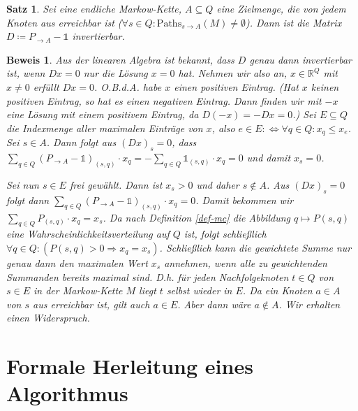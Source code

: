 \documentclass[a4paper]{article}
\newcommand{\mc}{Markow-Kette}
\newtheorem{satz}{Satz}[section] %
\theoremstyle{nonumberplain}
\newtheorem{beweis}{Beweis}
\begin{document}
\begin{satz}\label{th-unique}
	Sei \mcex{} eine endliche \mc, $A\subseteq Q$ eine Zielmenge, die von jedem Knoten aus erreichbar ist ($\forall s\in Q: \mathrm{Paths}_{s\rightarrow A}(M)\neq\emptyset$). 
	Dann ist die Matrix $D \coloneqq P_{\rightarrow A} - \mathbb{1}$ invertierbar.
\end{satz}
\begin{beweis}
	Aus der linearen Algebra ist bekannt, dass $D$ genau dann invertierbar ist, wenn $Dx = 0$ nur die Lösung $x=0$ hat.
	Nehmen wir also an, $x \in \mathbb{R}^Q$ mit $x\neq 0$ erfüllt $Dx = 0$. O.B.d.A. habe $x$ einen positiven Eintrag. (Hat $x$ keinen positiven Eintrag, so hat es einen negativen Eintrag. Dann finden wir mit $-x$ eine Lösung mit einem positivem Eintrag, da $D(-x) = - Dx = 0$.)
	Sei $E \subseteq Q$ die Indexmenge aller maximalen Einträge von $x$, also $e \in E :\Leftrightarrow \forall q \in Q : x_q \leq x_e$.
	Sei $s\in A$. Dann folgt aus $(Dx)_s = 0$, dass $\sum_{q\in Q}{(P_{\rightarrow A}- \mathbb{1})_{(s,q)} \cdot x_q} = -\sum_{q\in Q}{\mathbb{1}_{(s,q)} \cdot x_q} = 0$  und damit $x_s = 0$.
	
	Sei nun $s \in E$ frei gewählt. Dann ist $x_s > 0$ und daher $s\notin A$. Aus $(Dx)_s = 0$ folgt dann $\sum_{q\in Q}{(P_{\rightarrow A}- \mathbb{1})_{(s,q)} \cdot x_q} = 0$. Damit bekommen wir $\sum_{q\in Q}{P_{(s,q)} \cdot x_q} = x_s$. Da nach Definition \ref{def-mc} die Abbildung $q \mapsto P(s,q)$ eine Wahrscheinlichkeitsverteilung auf $Q$ ist, folgt schließlich $\forall q\in Q: (P(s,q) > 0 \Rightarrow x_q = x_s)$. Schließlich kann die gewichtete Summe nur genau dann den maximalen Wert $x_s$ annehmen, wenn alle zu gewichtenden Summanden bereits maximal sind. D.h. für jeden Nachfolgeknoten $t\in Q$ von $s\in E$ in der \mc{} $M$ liegt $t$ selbst wieder in $E$. Da ein Knoten $a\in A$ von $s$ aus erreichbar ist, gilt auch $a\in E$. Aber dann wäre $a\notin A$. Wir erhalten einen Widerspruch.
\end{beweis}


\section{Formale Herleitung eines Algorithmus}
\end{document}

